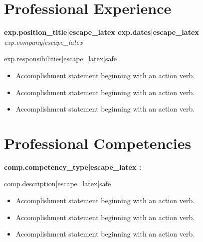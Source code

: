 \documentclass[11pt,letterpaper]{article}
\newcommand{\entryheader}[2]{
    \noindent\textbf{#1} \hfill \textbf{#2} \\
}
\newcommand{\entrysubheader}[1]{
    \noindent\textit{#1} \\
}
\begin{document}
{{{{{{{{{{{{{{{{%
\section{Professional Experience}

{%
\entryheader{ {{ exp.position_title|escape_latex }} }{ {{ exp.dates|escape_latex }} }
\entrysubheader{ {{ exp.company|escape_latex }} }
{%
{{ exp.responsibilities|escape_latex|safe }} \\
{%
\begin{itemize}[leftmargin=*,itemsep=2pt,parsep=0pt]
    \item Accomplishment statement beginning with an action verb.
    \item Accomplishment statement beginning with an action verb.
    \item Accomplishment statement beginning with an action verb.
\end{itemize}
{%
\vspace{8pt}

{%
{%


{%
\section{Professional Competencies}

{%
\textbf{ {{ comp.competency_type|escape_latex }}: } \\
{%
{{ comp.description|escape_latex|safe }} \\
{%
\begin{itemize}[leftmargin=*,itemsep=2pt,parsep=0pt]
    \item Accomplishment statement beginning with an action verb.
    \item Accomplishment statement beginning with an action verb.
    \item Accomplishment statement beginning with an action verb.
\end{itemize}
{%
\vspace{8pt}

{%
{%


}}}}}}}}}}}}}}}}}}}}}}}}}}}}}
\end{document}
